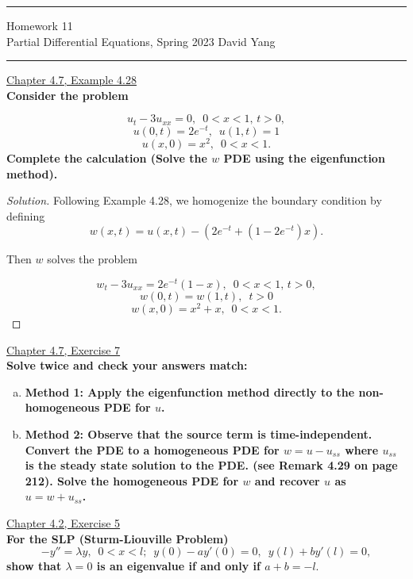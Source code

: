 \documentclass[11pt]{article}
\newenvironment{solution}
  {\renewcommand\qedsymbol{$\blacksquare$}\begin{proof}[Solution]}
  {\end{proof}}
\begin{document}
	\hrule
	\begin{center}
		{\Large Homework 11} \\ %
		\vspace{0.2cm}
		Partial Differential Equations, Spring 2023 \hfill David Yang %
	\end{center}

\hrule

\vspace{1em}


\underline{Chapter 4.7, Example 4.28} \\

\textbf{Consider the problem}

\[ u_t - 3u_{xx} = 0, \, \, \, 0 < x < 1, \, t > 0,\]
\[ u(0, t) = 2e^{-t}, \, \, \, u(1, t) = 1\]
\[ u(x, 0) = x^2, \, \, \, 0 < x < 1.\]
\textbf{Complete the calculation (Solve the $w$ PDE using the eigenfunction method).}

\begin{solution}
Following Example 4.28, we homogenize the boundary condition by defining \[ w(x, t) = u(x, t) - \left( 2e^{-t} + \left(1-2e^{-t}\right)x\right).\]

Then $w$ solves the problem 

\[ w_t - 3u_{xx} = 2e^{-t}(1-x), \, \, \, 0 < x < 1, \, t > 0,\]
\[ w(0, t) = w(1, t), \, \, \, t > 0\]
\[ w(x, 0) = x^2+x, \, \, \, 0 < x < 1.\]
\end{solution}

\underline{Chapter 4.7, Exercise 7} \\

\textbf{Solve twice and check your answers match:}

\begin{enumerate}[(a)]
    \item \textbf{Method 1: Apply the eigenfunction method directly to the non-homogeneous PDE for $u$.}
    \item \textbf{Method 2: Observe that the source term is time-independent. Convert the PDE to a homogeneous PDE for $w = u - u_{ss}$ where $u_{ss}$ is the steady state solution to the PDE.
    (see Remark 4.29 on page 212). Solve the homogeneous PDE for $w$ and recover $u$ as $u = w + u_{ss}$.}
\end{enumerate}

\newpage

\underline{Chapter 4.2, Exercise 5} \\

\textbf{For the SLP (Sturm-Liouville Problem)} \[-y'' = \lambda y, \, \, \, 0 < x < l; \, \, \, y(0) - ay'(0) = 0, \, \, \, y(l) + by'(l) = 0,\]
\textbf{show that $\lambda = 0$ is an eigenvalue if and only if $a+b = -l.$} \\
\end{document}
